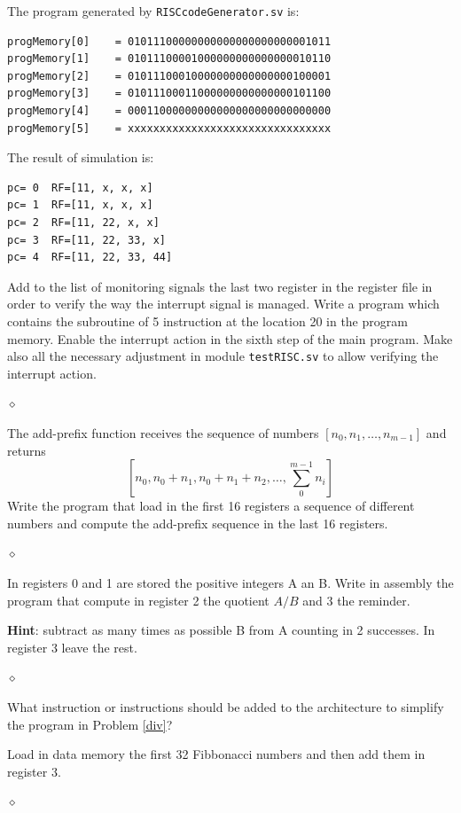 The program generated by {\tt RISCcodeGenerator.sv} is:
{\small
\begin{verbatim}
progMemory[0]    = 01011100000000000000000000001011
progMemory[1]    = 01011100001000000000000000010110
progMemory[2]    = 01011100010000000000000000100001
progMemory[3]    = 01011100011000000000000000101100
progMemory[4]    = 00011000000000000000000000000000
progMemory[5]    = xxxxxxxxxxxxxxxxxxxxxxxxxxxxxxxx
\end{verbatim}
}
The result of simulation is:
{\small
\begin{verbatim}
pc= 0  RF=[11, x, x, x]
pc= 1  RF=[11, x, x, x]
pc= 2  RF=[11, 22, x, x]
pc= 3  RF=[11, 22, 33, x]
pc= 4  RF=[11, 22, 33, 44]
\end{verbatim}
}

\begin{problem}
Add to the list of monitoring signals the last two register in the register file in order to verify the way the interrupt signal is managed. Write a program which contains the subroutine of 5 instruction at the location 20 in the program memory. Enable the interrupt action in the sixth step of the main program. Make also all the necessary adjustment in module {\tt testRISC.sv} to allow verifying the interrupt action.

$\diamond$
\end{problem}


\begin{problem}
The add-prefix function receives the sequence of numbers $[n_0, n_1, \ldots, n_{m-1}]$ and returns $$[n_0, n_0 + n_1, n_0 + n_1 + n_2, \ldots, \sum_0^{m-1} n_i]$$
Write the program that load in the first 16 registers a sequence of different numbers and compute the add-prefix sequence in the last 16 registers.

$\diamond$
\end{problem}


\begin{problem}\label{div}
In registers 0 and 1 are stored the positive integers A an B. Write in assembly the program that compute in register 2 the quotient $A / B$ and 3 the reminder.

{\bf Hint}: subtract as many times as possible B from A counting in 2 successes. In register 3 leave the rest.

$\diamond$
\end{problem}
What instruction or instructions should be added to the architecture to simplify the program in Problem \ref{div}?

\begin{problem}
Load in data memory the first 32 Fibbonacci numbers and then add them in register 3.


$\diamond$
\end{problem}








